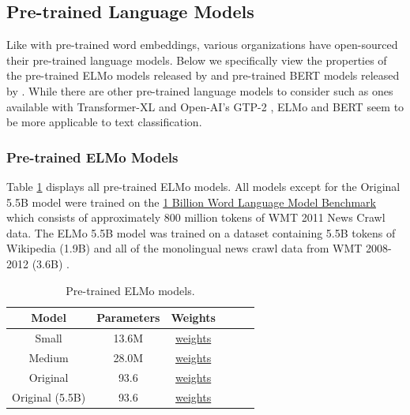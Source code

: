 \subsection{Pre-trained Language Models}

Like with pre-trained word embeddings, various organizations have open-sourced their pre-trained language models. Below we specifically view the properties of the pre-trained ELMo models released by \citep{Peters:2018} and pre-trained BERT models released by \citep{DBLP:journals/corr/abs-1810-04805}. While there are other pre-trained language models to consider such as ones available with Transformer-XL \citep{DBLP:journals/corr/abs-1901-02860} and Open-AI's GTP-2 \citep{radford2019language}, ELMo and BERT seem to be more applicable to text classification. 

\subsubsection{Pre-trained ELMo Models}

Table \ref{table:4} displays all pre-trained ELMo models. 
All models except for the Original 5.5B model were trained on the \href{http://www.statmt.org/lm-benchmark/}{1 Billion Word Language Model Benchmark} which consists of approximately 800 million tokens of WMT 2011 News Crawl data. The ELMo 5.5B model was trained on a dataset containing 5.5B tokens of Wikipedia (1.9B) and all of the monolingual news crawl data from WMT 2008-2012 (3.6B) \citep{Peters:2018}.

\begin{table}[h!]
  \begin{center}
    \begin{tabular}{ |c|c|c|c|c|c| }
    \hline
      \textbf{Model} & \textbf{Parameters} & \textbf{Weights} \\ 
      \hline
      Small & 13.6M & \href{https://s3-us-west-2.amazonaws.com/allennlp/models/elmo/2x1024_128_2048cnn_1xhighway/elmo_2x1024_128_2048cnn_1xhighway_weights.hdf5}{weights} \\     
      Medium & 28.0M & \href{https://s3-us-west-2.amazonaws.com/allennlp/models/elmo/2x2048_256_2048cnn_1xhighway/elmo_2x2048_256_2048cnn_1xhighway_weights.hdf5}{weights} \\  
      Original & 93.6 & \href{https://s3-us-west-2.amazonaws.com/allennlp/models/elmo/2x4096_512_2048cnn_2xhighway/elmo_2x4096_512_2048cnn_2xhighway_weights.hdf5}{weights} \\  
      Original (5.5B) & 93.6 & \href{https://s3-us-west-2.amazonaws.com/allennlp/models/elmo/2x4096_512_2048cnn_2xhighway_5.5B/elmo_2x4096_512_2048cnn_2xhighway_5.5B_weights.hdf5}{weights} \\   
    \hline 
    \end{tabular}
    \caption{Pre-trained ELMo models.}
    \label{table:4}
    \citep{Peters:2018}
  \end{center}
\end{table}

